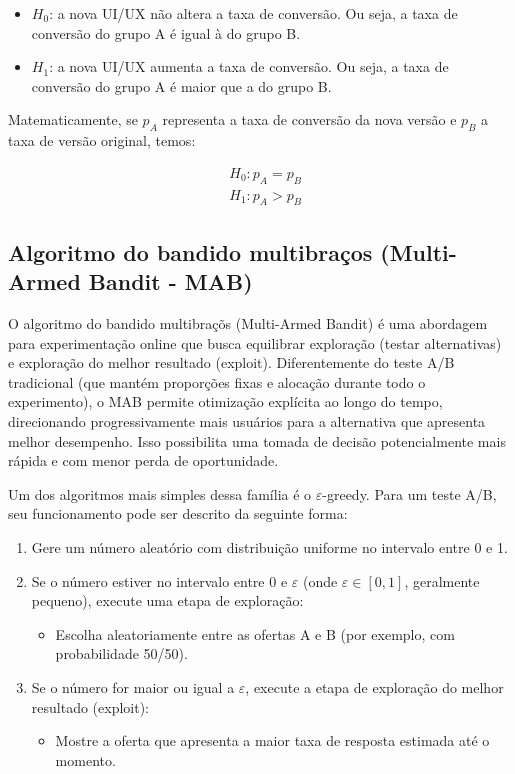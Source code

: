 \documentclass{article}
\begin{document}
\begin{itemize}
    \item $H_0$: a nova UI/UX não altera a taxa de conversão. Ou seja, a taxa de conversão do grupo A é igual à do grupo B.
    \item $H_1$: a nova UI/UX aumenta a taxa de conversão. Ou seja, a taxa de conversão do grupo A é maior que a do grupo B.
\end{itemize}

Matematicamente, se $p_A$ representa a taxa de conversão da nova versão e $p_B$ a taxa de versão original, temos:

\begin{align*}
    &H_0: p_A = p_B \\
    &H_1: p_A > p_B
\end{align*}

\subsection{Algoritmo do bandido multibraços (Multi-Armed Bandit - MAB)}

O algoritmo do bandido multibraçõs (Multi-Armed Bandit) é uma abordagem para experimentação
online que busca equilibrar exploração (testar alternativas) e exploração do melhor resultado
(exploit). Diferentemente do teste A/B tradicional (que mantém proporções fixas e alocação durante
todo o experimento), o MAB permite otimização explícita ao longo do tempo, direcionando progressivamente
mais usuários para a alternativa que apresenta melhor desempenho. Isso possibilita uma tomada
de decisão potencialmente mais rápida e com menor perda de oportunidade.

Um dos algoritmos mais simples dessa família é o $\varepsilon$-greedy. Para um teste A/B,
seu funcionamento pode ser descrito da seguinte forma:

\begin{enumerate}
\item Gere um número aleatório com distribuição uniforme no intervalo entre 0 e 1.
\item Se o número estiver no intervalo entre 0 e $\varepsilon$ (onde $\varepsilon \in [0,1]$, geralmente pequeno), execute uma etapa de exploração:
\begin{itemize}
\item Escolha aleatoriamente entre as ofertas A e B (por exemplo, com probabilidade 50/50).
\end{itemize}
\item Se o número for maior ou igual a $\varepsilon$, execute a etapa de exploração do melhor resultado (exploit):
\begin{itemize}
\item Mostre a oferta que apresenta a maior taxa de resposta estimada até o momento.
\end{itemize}
\end{enumerate}
\end{document}
